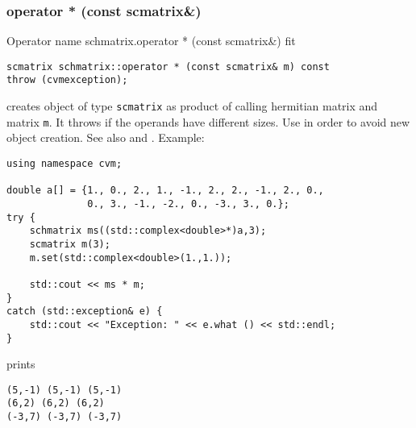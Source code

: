 \subsubsection{operator * (const scmatrix\&)}
Operator%
\pdfdest name {schmatrix.operator * (const scmatrix&)} fit
\begin{verbatim}
scmatrix schmatrix::operator * (const scmatrix& m) const
throw (cvmexception);
\end{verbatim}
creates  object of type \verb"scmatrix"
as  product of  calling hermitian matrix and  matrix \verb"m".
It throws  
if the operands have different sizes.
Use  in order to avoid
 new object creation.
See also
 and .
Example:
\begin{Verbatim}
using namespace cvm;

double a[] = {1., 0., 2., 1., -1., 2., 2., -1., 2., 0.,
              0., 3., -1., -2., 0., -3., 3., 0.};
try {
    schmatrix ms((std::complex<double>*)a,3);
    scmatrix m(3);
    m.set(std::complex<double>(1.,1.));

    std::cout << ms * m;
}
catch (std::exception& e) {
    std::cout << "Exception: " << e.what () << std::endl;
}
\end{Verbatim}
prints
\begin{Verbatim}
(5,-1) (5,-1) (5,-1)
(6,2) (6,2) (6,2)
(-3,7) (-3,7) (-3,7)
\end{Verbatim}
\newpage





